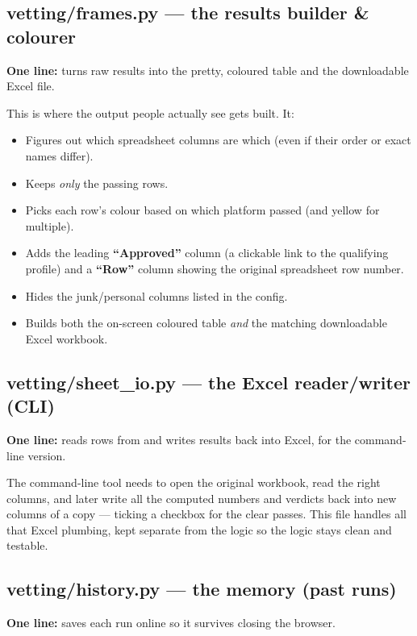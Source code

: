 \documentclass[11pt]{article}
\begin{document}
\subsection{vetting/frames.py — the results builder \& colourer}
\begin{plainbox}
\textbf{One line:} turns raw results into the pretty, coloured table and the
downloadable Excel file.
\end{plainbox}

This is where the output people actually see gets built. It:
\begin{itemize}
  \item Figures out which spreadsheet columns are which (even if their order or
  exact names differ).
  \item Keeps \emph{only} the passing rows.
  \item Picks each row's colour based on which platform passed (and yellow for
  multiple).
  \item Adds the leading \textbf{``Approved''} column (a clickable link to the
  qualifying profile) and a \textbf{``Row''} column showing the original
  spreadsheet row number.
  \item Hides the junk/personal columns listed in the config.
  \item Builds both the on-screen coloured table \emph{and} the matching
  downloadable Excel workbook.
\end{itemize}

\subsection{vetting/sheet\_io.py — the Excel reader/writer (CLI)}
\begin{plainbox}
\textbf{One line:} reads rows from and writes results back into Excel, for the
command-line version.
\end{plainbox}

The command-line tool needs to open the original workbook, read the right
columns, and later write all the computed numbers and verdicts back into new
columns of a copy — ticking a checkbox for the clear passes. This file handles
all that Excel plumbing, kept separate from the logic so the logic stays clean
and testable.

\subsection{vetting/history.py — the memory (past runs)}
\begin{plainbox}
\textbf{One line:} saves each run online so it survives closing the browser.
\end{plainbox}
\end{document}
